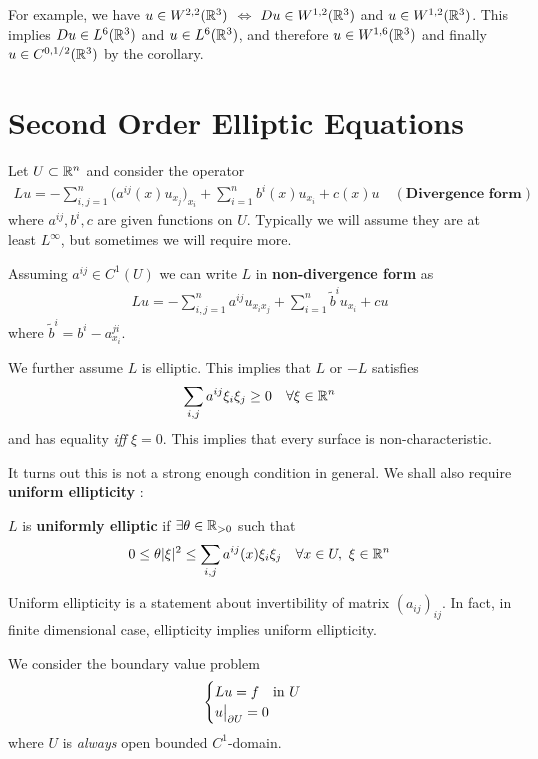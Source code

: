 \documentclass[10pt,a4paper]{report}
\begin{document}
For example, we have $u \in W^{2,2}(\mathbb{R}^3)$ $\Leftrightarrow$ $Du \in W^{1,2}(\mathbb{R}^3)$ and $u \in W^{1,2}(\mathbb{R}^3)$. This implies $Du \in L^6(\mathbb{R}^3)$ and $u\in L^6(\mathbb{R}^3)$, and therefore $u\in W^{1,6}(\mathbb{R}^3)$ and finally $u \in C^{0,1/2}(\mathbb{R}^3)$ by the corollary.
\s

\section*{Second Order Elliptic Equations}

Let $U\subset \mathbb{R}^n$ and consider the operator
\begin{align*}
Lu = - \sum_{i,j=1}^n \big( a^{ij}(x) u_{x_j} \big)_{x_i} + \sum_{i=1}^n b^i (x) u_{x_i} + c(x)u \quad (\textbf{Divergence form})
\end{align*}
where $a^{ij},b^i,c$ are given functions on $U$. Typically we will assume they are at least $L^{\infty}$, but sometimes we will require more. 

\quad Assuming $a^{ij} \in C^{1}(U)$ we can write $L$ in \textbf{non-divergence form} as
\begin{align*}
Lu = -\sum_{i,j=1}^n a^{ij}u_{x_i x_j} + \sum_{i=1}^n \tilde{b}^i u_{x_i} + cu 
\end{align*}
where $\tilde{b}^i = b^i - a^{ji}_{x_i}$.

\quad We further assume $L$ is elliptic. This implies that $L$ or $-L$ satisfies
\begin{align*}
\sum_{i,j} a^{ij} \xi_i \xi_j \geq 0 \quad \forall \xi \in \mathbb{R}^n
\end{align*}
and has equality \emph{iff} $\xi=0$. This implies that every surface is non-characteristic. 
\s

It turns out this is not a strong enough condition in general. We shall also require \textbf{uniform ellipticity} :
\s

 $L$ is \textbf{uniformly elliptic} if $\exists \theta \in \mathbb{R}_{>0}$ such that
\begin{align*}
0 \leq \theta |\xi|^2 \leq \sum_{i,j} a^{ij}(x) \xi_i \xi_j \quad \forall x\in U, \,\, \xi\in \mathbb{R}^n
\end{align*}
\s

Uniform ellipticity is a statement about invertibility of matrix $(a_{ij})_{ij}$. In fact, in finite dimensional case, ellipticity implies uniform ellipticity.
\s

We consider the boundary value problem
\begin{align}
\begin{cases} 
Lu = f \quad \text{in } U \\
u\big|_{\partial U} =0
\end{cases} \label{12}
\end{align} 
where $U$ is \emph{always} open bounded $C^1$-domain.
\s
\end{document}
